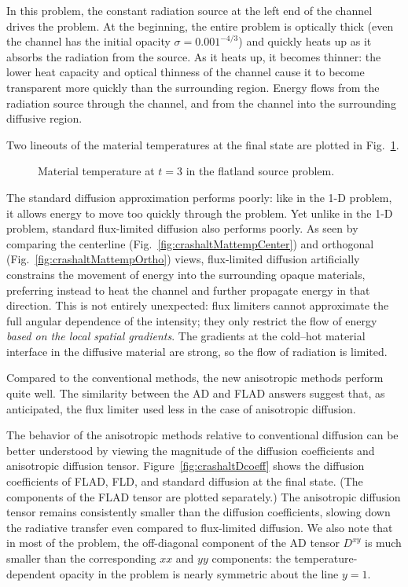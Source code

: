 In this problem, the constant radiation source at the left end of the channel
drives the problem. At the beginning, the entire problem is optically thick
(even the channel has the initial opacity $\sigma=0.001^{-4/3}$) and quickly
heats up as it absorbs the radiation from the source. As it heats up, it becomes
thinner: the lower heat capacity and optical thinness of the channel cause it to
become transparent more quickly than the surrounding region. Energy flows
from the radiation source through the channel, and from the channel into the
surrounding diffusive region.

Two lineouts of the material temperatures at the final state are plotted in
Fig.~\ref{fig:crashaltMattemp}.
%
\begin{figure}[htb]
  \centering\small
  \caption{Material temperature at $t=3$ in the flatland source problem.}
  \label{fig:crashaltMattemp}
\end{figure}
%
The standard diffusion approximation performs
poorly: like in the 1-D problem, it allows energy to move too quickly through
the problem. Yet unlike in the 1-D problem, standard flux-limited diffusion also
performs poorly. As seen by comparing the centerline
(Fig.~\ref{fig:crashaltMattempCenter}) and orthogonal
(Fig.~\ref{fig:crashaltMattempOrtho}) views, flux-limited diffusion artificially
constrains the movement of energy into the surrounding opaque materials,
preferring instead to heat the channel and further propagate energy in that
direction. This is not entirely unexpected: flux limiters cannot approximate the
full angular dependence of the intensity; they only restrict the flow of energy
\emph{based on the local spatial gradients}. The gradients at the cold--hot
material interface in the diffusive material are strong, so the flow of
radiation is limited.

Compared to the conventional methods, the new anisotropic methods perform quite
well. The similarity between the AD and FLAD answers suggest that, as
anticipated, the flux limiter used less in the case of anisotropic diffusion.

The behavior of the anisotropic methods relative to conventional
diffusion can be better understood by viewing the magnitude of the
diffusion coefficients and anisotropic diffusion tensor.
Figure~\ref{fig:crashaltDcoeff} shows the diffusion coefficients
of FLAD, FLD, and standard diffusion at the final state. (The components of the
FLAD tensor are plotted separately.)
The anisotropic diffusion tensor
remains consistently smaller than the diffusion coefficients, slowing down the
radiative transfer even compared to flux-limited diffusion. We also note that in
most of the problem, the off-diagonal component of the AD tensor $D^{xy}$ is
much smaller than the corresponding $xx$ and $yy$ components: the
temperature-dependent opacity in the problem is nearly symmetric about the line
$y=1$.

